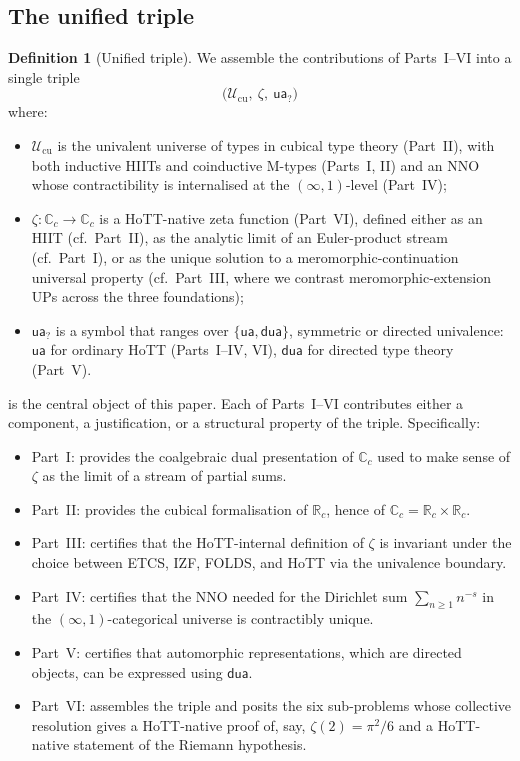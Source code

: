 \documentclass[12pt]{article}
\theoremstyle{definition}
\newtheorem{definition}[theorem]{Definition}
\theoremstyle{remark}
\newcommand{\Type}{\mathcal{U}}
\newcommand{\R}{\mathbb{R}}
\newcommand{\C}{\mathbb{C}}
\newcommand{\Rc}{\R_{c}}
\newcommand{\Cc}{\C_{c}}
\newcommand{\ua}{\mathsf{ua}}
\newcommand{\dua}{\mathsf{dua}}
\begin{document}
\subsection{The unified triple}

\begin{definition}[Unified triple]\label{def:triple}
We assemble the contributions of Parts~I--VI into a single triple
\[
\bigl(\Type_{\mathrm{cu}},\ \zeta,\ \ua_{?}\bigr)
\]
where:
\begin{itemize}
\item $\Type_{\mathrm{cu}}$ is the univalent universe of types
      in cubical type theory (Part~II), with both inductive HIITs and
      coinductive M-types (Parts~I, II) and an NNO whose contractibility
      is internalised at the $(\infty,1)$-level (Part~IV);
\item $\zeta : \Cc \to \Cc$ is a HoTT-native zeta function (Part~VI),
      defined either as an HIIT (cf.\ Part~II), as the analytic limit of
      an Euler-product stream (cf.\ Part~I), or as the unique solution to
      a meromorphic-continuation universal property (cf.\ Part~III, where
      we contrast meromorphic-extension UPs across the three foundations);
\item $\ua_{?}$ is a symbol that ranges over $\{\ua, \dua\}$,
      symmetric or directed univalence: $\ua$ for ordinary HoTT
      (Parts~I--IV, VI), $\dua$ for directed type theory (Part~V).
\end{itemize}
\end{definition}

 is the central object of this paper. Each of Parts~I--VI
contributes either a component, a justification, or a structural
property of the triple. Specifically:
\begin{itemize}
\item Part~I: provides the coalgebraic dual presentation of $\Cc$ used
      to make sense of $\zeta$ as the limit of a stream of partial sums.
\item Part~II: provides the cubical formalisation of $\Rc$, hence of
      $\Cc = \Rc \times \Rc$.
\item Part~III: certifies that the HoTT-internal definition of $\zeta$
      is invariant under the choice between ETCS, IZF, FOLDS, and HoTT
      via the univalence boundary.
\item Part~IV: certifies that the NNO needed for the Dirichlet sum
      $\sum_{n \geq 1} n^{-s}$ in the $(\infty,1)$-categorical universe
      is contractibly unique.
\item Part~V: certifies that automorphic representations, which are
      directed objects, can be expressed using $\dua$.
\item Part~VI: assembles the triple and posits the six sub-problems
      whose collective resolution gives a HoTT-native proof of, say,
      $\zeta(2) = \pi^2/6$ and a HoTT-native statement of the Riemann
      hypothesis.
\end{itemize}
\end{document}
